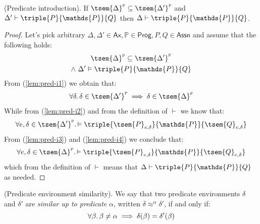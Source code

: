 \begin{lem}
	\label{lem:pred-i}
	(Predicate introduction).
	If $\tsem{\Delta}^\textsc{p} \subseteq \tsem{\Delta'}^\textsc{p}$ and $\Delta' \vdash \triple{P}{\mathds{P}}{Q}$ then $\Delta \vdash \triple{P}{\mathds{P}}{Q}$.
	\begin{proof}
		Let's pick arbitrary $\Delta, \Delta' \in \mathsf{Ax}, \mathds{P} \in \mathsf{Prog}, P, Q \in \mathsf{Assn}$ and assume that the following holds:
		\begin{gather}
			\label{lem:pred-i1} \tsem{\Delta}^\textsc{p} \subseteq \tsem{\Delta'}^\textsc{p} \\
			\label{lem:pred-i2} \land\ \Delta' \vDash \triple{P}{\mathds{P}}{Q}
		\end{gather}
		From (\ref{lem:pred-i1}) we obtain that:
		\begin{gather}
			\label{lem:pred-i3} \forall \delta \ldotp \delta \in \tsem{\Delta'}^\textsc{p} \implies \delta \in \tsem{\Delta}^\textsc{p}
		\end{gather}
		While from (\ref{lem:pred-i2}) and from the definition of $\vdash$ we know that:
		\begin{gather}
			\label{lem:pred-i4} \forall e, \delta \in \tsem{\Delta'}^\textsc{p} \ldotp
			\vDash \triple{\tsem{P}_{e, \delta}}{\mathds{P}}{\tsem{Q}_{e, \delta}}
		\end{gather}
		From (\ref{lem:pred-i3}) and (\ref{lem:pred-i4}) we conclude that:
		\[
			\forall e, \delta \in \tsem{\Delta}^\textsc{p} \ldotp
			\vDash \triple{\tsem{P}_{e, \delta}}{\mathds{P}}{\tsem{Q}_{e, \delta}}
		\]
		which from the definition of $\vdash$ means that $\Delta \vdash \triple{P}{\mathds{P}}{Q}$ as needed.
	\end{proof}
\end{lem}

\begin{defn}
	(Predicate environment similarity).
	We say that two predicate environments $\delta$ and $\delta'$ are \emph{similar up to predicate} $\alpha$, written $\delta \approx^\alpha \delta'$, if and only if:
	\[
		\forall \beta \ldotp \beta \neq \alpha \implies \delta(\beta) = \delta'(\beta)
	\]
\end{defn}


